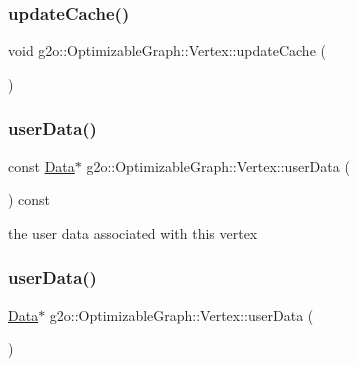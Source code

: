 \subsubsection{\texorpdfstring{update\+Cache()}{updateCache()}}
{\footnotesize\ttfamily void g2o\+::\+Optimizable\+Graph\+::\+Vertex\+::update\+Cache (\begin{DoxyParamCaption}{ }\end{DoxyParamCaption})\hspace{0.3cm}{\ttfamily [virtual]}}

\mbox{\label{classg2o_1_1_optimizable_graph_1_1_vertex_a506c9664e88d886ba612d3ea95b6c76b}} 
\subsubsection{\texorpdfstring{user\+Data()}{userData()}\hspace{0.1cm}{\footnotesize\ttfamily [1/2]}}
{\footnotesize\ttfamily const \mbox{\hyperlink{classg2o_1_1_optimizable_graph_1_1_data}{Data}}$\ast$ g2o\+::\+Optimizable\+Graph\+::\+Vertex\+::user\+Data (\begin{DoxyParamCaption}{ }\end{DoxyParamCaption}) const\hspace{0.3cm}{\ttfamily [inline]}}



the user data associated with this vertex 

\mbox{\label{classg2o_1_1_optimizable_graph_1_1_vertex_a768057be134ffe93bc88b020d031eee5}} 
\subsubsection{\texorpdfstring{user\+Data()}{userData()}\hspace{0.1cm}{\footnotesize\ttfamily [2/2]}}
{\footnotesize\ttfamily \mbox{\hyperlink{classg2o_1_1_optimizable_graph_1_1_data}{Data}}$\ast$ g2o\+::\+Optimizable\+Graph\+::\+Vertex\+::user\+Data (\begin{DoxyParamCaption}{ }\end{DoxyParamCaption})\hspace{0.3cm}{\ttfamily [inline]}}

